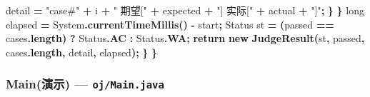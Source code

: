 \documentclass[
  11pt,
]{ctexart}
\newenvironment{Shaded}{\begin{snugshade}}{\end{snugshade}}
\newcommand{\BuiltInTok}[1]{#1}
\newcommand{\ControlFlowTok}[1]{\textcolor[rgb]{0.13,0.29,0.53}{\textbf{#1}}}
\newcommand{\DataTypeTok}[1]{\textcolor[rgb]{0.13,0.29,0.53}{#1}}
\newcommand{\FunctionTok}[1]{\textcolor[rgb]{0.13,0.29,0.53}{\textbf{#1}}}
\newcommand{\KeywordTok}[1]{\textcolor[rgb]{0.13,0.29,0.53}{\textbf{#1}}}
\newcommand{\NormalTok}[1]{#1}
\newcommand{\OperatorTok}[1]{\textcolor[rgb]{0.81,0.36,0.00}{\textbf{#1}}}
\newcommand{\StringTok}[1]{\textcolor[rgb]{0.31,0.60,0.02}{#1}}
\begin{document}
\begin{Shaded}
\begin{Highlighting}[]
\NormalTok{                detail }\OperatorTok{=} \StringTok{"case\#"} \OperatorTok{+}\NormalTok{ i }\OperatorTok{+} \StringTok{" 期望["} \OperatorTok{+}\NormalTok{ expected }\OperatorTok{+} \StringTok{"] 实际["} \OperatorTok{+}\NormalTok{ actual }\OperatorTok{+} \StringTok{"]"}\OperatorTok{;}
            \OperatorTok{\}}
        \OperatorTok{\}}
        \DataTypeTok{long}\NormalTok{ elapsed }\OperatorTok{=} \BuiltInTok{System}\OperatorTok{.}\FunctionTok{currentTimeMillis}\OperatorTok{()} \OperatorTok{{-}}\NormalTok{ start}\OperatorTok{;}
\NormalTok{        Status st }\OperatorTok{=} \OperatorTok{(}\NormalTok{passed }\OperatorTok{==}\NormalTok{ cases}\OperatorTok{.}\FunctionTok{length}\OperatorTok{)} \OperatorTok{?}\NormalTok{ Status}\OperatorTok{.}\FunctionTok{AC} \OperatorTok{:}\NormalTok{ Status}\OperatorTok{.}\FunctionTok{WA}\OperatorTok{;}
        \ControlFlowTok{return} \KeywordTok{new} \FunctionTok{JudgeResult}\OperatorTok{(}\NormalTok{st}\OperatorTok{,}\NormalTok{ passed}\OperatorTok{,}\NormalTok{ cases}\OperatorTok{.}\FunctionTok{length}\OperatorTok{,}\NormalTok{ detail}\OperatorTok{,}\NormalTok{ elapsed}\OperatorTok{);}
    \OperatorTok{\}}
\OperatorTok{\}}
\end{Highlighting}
\end{Shaded}

\hypertarget{mainux6f14ux793a-ojmain.java}{%
\subsubsection{\texorpdfstring{Main(演示) ---
\texttt{oj/Main.java}}{Main(演示) --- oj/Main.java}}\label{mainux6f14ux793a-ojmain.java}}
\end{document}
